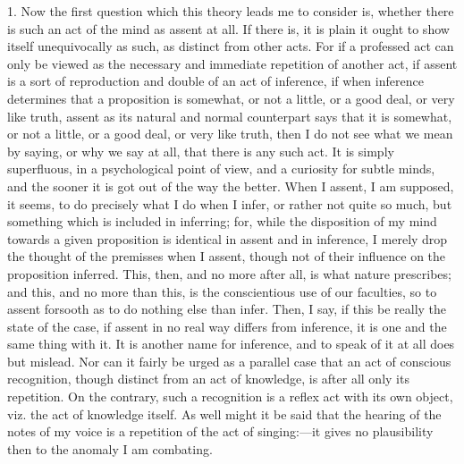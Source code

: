 1. Now the first question which this theory leads me to consider
is, whether there is such an act of the mind as assent at all. If
there is, it is plain it ought to show itself unequivocally as such,
as distinct from other acts. For if a professed act can only be viewed
as the necessary and immediate repetition of another act, if assent is
a sort of reproduction and double of an act of inference, if when
inference determines that a proposition is somewhat, or not a little,
or a good deal, or very like truth, assent as its natural and normal
counterpart says that it is somewhat, or not a little, or a good deal,
or very like truth, then I do not see what we mean by saying, or why
we say at all, that there is any such act. It is simply superfluous,
in a psychological point of view, and a curiosity for subtle minds,
and the sooner it is got out of the way the better. When I assent, I
am supposed, it seems, to do precisely what I do when I infer, or
rather not quite so much, but something which is included in
inferring; for, while the disposition of my mind towards a given
proposition is identical in assent and in inference, I merely drop the
thought of the premisses when I assent, though not of their influence
on the proposition inferred. This, then, and no more after all, is
what nature prescribes; and this, and no more than this, is the
conscientious use of our faculties, so to assent forsooth as to do
nothing else than infer. Then, I say, if this be really the state of
the case, if assent in no real way differs from inference, it is one
and the same thing with it. It is another name for inference, and to
speak of it at all does but mislead. Nor can it fairly be urged as a
parallel case that an act of conscious recognition, though
distinct from an act of knowledge, is after all only its repetition.
On the contrary, such a recognition is a reflex act with its own
object, viz. the act of knowledge itself. As well might it be said
that the hearing of the notes of my voice is a repetition of the act
of singing:—it gives no plausibility then to the anomaly I am
combating.

